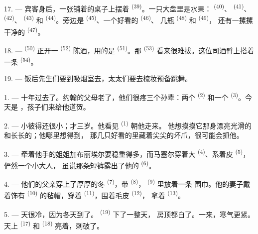17. --- 宾客身后，一张铺着的桌子上摆着
\textsuperscript{(39)}。一只大盘里是水果： \textsuperscript{(40)}、
 \textsuperscript{(41)}、 \textsuperscript{(42)}、
 \textsuperscript{(43)} 和 \textsuperscript{(44)}。旁边是
 \textsuperscript{(45)}、一个好看的 \textsuperscript{(46)}、
几瓶 \textsuperscript{(48)} 和 \textsuperscript{(49)}，
还有一摞摞干净的 \textsuperscript{(47)}。

18. ---  \textsuperscript{(50)} 正开一 \textsuperscript{(52)}
陈酒，用的是 \textsuperscript{(51)}。那 \textsuperscript{(53)}
看来很难拔。这位司酒臂上搭着一条 \textsuperscript{(54)}。

19. --- 饭后先生们要到吸烟室去，太太们要去梳妆预备跳舞。

\VUsaut{5.0mm}
\VUsaut{1.6mm}
\VUsaut{2.6mm}

\VUsaut{3.0mm}

1. --- 十年过去了。约翰的父母老了，他们很疼三个孙辈：两个
\textsuperscript{(2)} 和一个 \textsuperscript{(3)}。今天是
，孩子们来给他道贺。

2. --- 小彼得还很小；才三岁。他看见 \textsuperscript{(1)} 朝他走来。
他想摸摸它那身漂亮光滑的和长长的；他哪里想得到，
那几只好看的里藏着尖尖的坏爪，很可能会抓他。

3. --- 牵着他手的姐姐加布丽埃尔要稳重得多，而马塞尔穿着大
\textsuperscript{(4)}、系着皮 \textsuperscript{(5)}，俨然一个小大人，
虽说那条短裤露出了他的 \textsuperscript{(6)}。

4. --- 他们的父亲穿上了厚厚的冬 \textsuperscript{(7)}，带
 \textsuperscript{(8)}， \textsuperscript{(9)} 里放着一条
围巾。他的妻子戴着饰有 \textsuperscript{(10)} 的毡帽，穿着
 \textsuperscript{(11)}，围着毛皮 \textsuperscript{(12)}，
拿着 \textsuperscript{(13)}。

5. --- 天很冷，因为冬天到了。 \textsuperscript{(19)} 下了一整天，
房顶都白了。一来，寒气更紧。天上 \textsuperscript{(17)}
和 \textsuperscript{(18)} 亮着，刺破了。

